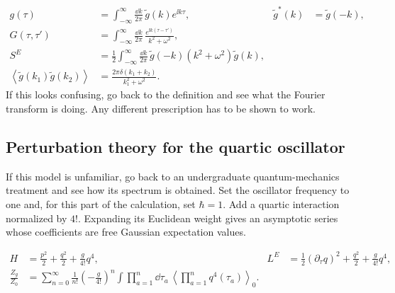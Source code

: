 \begin{align}
  g(\tau)&=\int_{-\infty}^{\infty}\frac{\dd k}{2\pi}\,
  \widetilde g(k)e^{\ii k\tau},
  &\widetilde g^*(k)&=\widetilde g(-k),
  \label{eq:253a-ch02-fourier-convention}\\
  G(\tau,\tau')&=\int_{-\infty}^{\infty}\frac{\dd k}{2\pi}\,
  \frac{e^{\ii k(\tau-\tau')}}{k^2+\omega^2},
  \label{eq:253a-ch02-fourier-green-function}\\
  S^E&=\frac12\int_{-\infty}^{\infty}\frac{\dd k}{2\pi}\,
  \widetilde g(-k)(k^2+\omega^2)\widetilde g(k),
  \label{eq:253a-ch02-fourier-action}\\
  \left\langle\widetilde g(k_1)\widetilde g(k_2)\right\rangle
  &=\frac{2\pi\delta(k_1+k_2)}{k_1^2+\omega^2}.
  \label{eq:253a-ch02-fourier-covariance}
\end{align}
If this looks confusing, go back to the definition and see what the Fourier transform is doing. Any different prescription has to be shown to work.

\subsection{Perturbation theory for the quartic oscillator}

If this model is unfamiliar, go back to an undergraduate quantum-mechanics treatment and see how its spectrum is obtained. Set the oscillator frequency to one and, for this part of the calculation, set $\hbar=1$. Add a quartic interaction normalized by $4!$. Expanding its Euclidean weight gives an asymptotic series whose coefficients are free Gaussian expectation values.

\begin{align}
  H&=\frac{p^2}{2}+\frac{q^2}{2}+\frac{g}{4!}q^4,
  &L^E&=\frac12(\partial_\tau q)^2+\frac{q^2}{2}+\frac{g}{4!}q^4,
  \label{eq:253a-ch02-quartic-oscillator}\\
  \frac{Z_g}{Z_0}
  &=\sum_{n=0}^{\infty}\frac1{n!}\left(-\frac{g}{4!}\right)^n
  \int \prod_{a=1}^{n}\dd\tau_a\,
  \left\langle \prod_{a=1}^{n}q^4(\tau_a)\right\rangle_0.
  \label{eq:253a-ch02-quartic-expansion}
\end{align}

